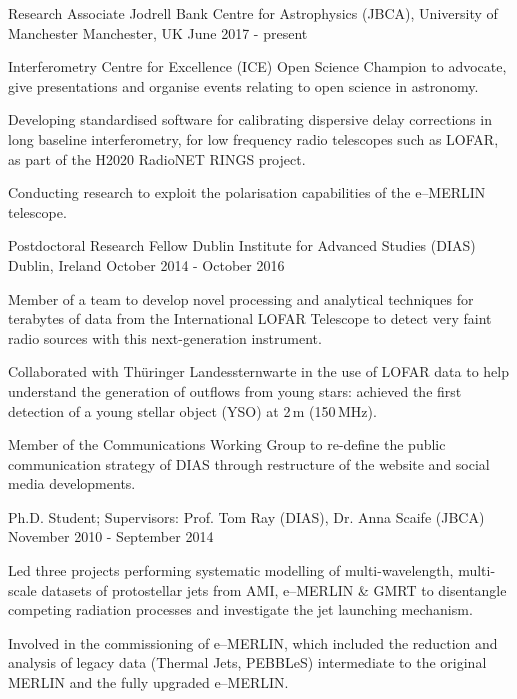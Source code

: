 \begin{cventries}
  \cventry
    {Research Associate}
    {Jodrell Bank Centre for Astrophysics (JBCA), University of Manchester}
    {Manchester, UK}
    {June 2017 - present}
    {
      \begin{cvitems}
        \item {Interferometry Centre for Excellence (ICE) Open Science Champion to advocate, give presentations and organise events relating to open science in astronomy.}
        \item {Developing standardised software for calibrating dispersive delay corrections in long baseline interferometry, for low frequency radio telescopes such as LOFAR, as part of the H2020 RadioNET RINGS project.}
        \item {Conducting research to exploit the polarisation capabilities of the e--MERLIN telescope.}
      \end{cvitems}
    }
\cventry
    {Postdoctoral Research Fellow}
    {Dublin Institute for Advanced Studies (DIAS)}
    {Dublin, Ireland}
    {October 2014 - October 2016}
    {
      \begin{cvitems}
        \item {Member of a team to develop novel processing and analytical techniques for terabytes of data from the International LOFAR Telescope to detect very faint radio sources with this next-generation instrument.}
        \item {Collaborated with Th{\"u}ringer Landessternwarte in the use of LOFAR data to help understand the generation of outflows from young stars: achieved the first detection of a young stellar object (YSO) at 2\,m (150\,MHz).}
        \item {Member of the Communications Working Group to re-define the public communication strategy of DIAS through restructure of the website and social media developments.}
      \end{cvitems}
    }
  \cventry
    {Ph.D. Student; Supervisors: Prof. Tom Ray (DIAS), Dr. Anna Scaife (JBCA)}
    {}
    {}
    {November 2010 - September 2014}
    {
      \begin{cvitems}
        \item {Led three projects performing systematic modelling of multi-wavelength, multi-scale datasets of protostellar jets from AMI, e--MERLIN \& GMRT to disentangle competing radiation processes and investigate the jet launching mechanism.}
        \item {Involved in the commissioning of e--MERLIN, which included the reduction and analysis of legacy data (Thermal Jets, PEBBLeS) intermediate to the original MERLIN and the fully upgraded e--MERLIN.}

\end{cvitems}}
\end{cventries}
